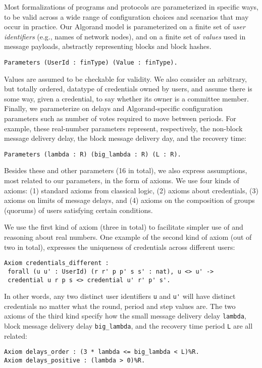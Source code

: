 Most formalizations of programs and protocols are parameterized in specific ways, to be valid across a wide range of configuration choices and scenarios that may occur in practice. Our Algorand model is parameterized on a finite set of \emph{user identifiers} (e.g., names of network nodes), and on a finite set of \emph{values} used in message payloads, abstractly representing blocks and block hashes.

\begin{lstlisting}[language=Coq]
Parameters (UserId : finType) (Value : finType).
\end{lstlisting}

Values are assumed to be checkable for validity. We also consider an arbitrary, but totally ordered, datatype of credentials owned by users, and assume there is some way, given a credential, to say whether its owner is a committee member. Finally, we parameterize on delays and Algorand-specific configuration parameters such as number of votes required to move between periods. For example, these real-number parameters represent, respectively, the non-block message delivery delay, the block message delivery day, and the recovery time:
\begin{lstlisting}[language=Coq]
Parameters (lambda : R) (big_lambda : R) (L : R).
\end{lstlisting}

Besides these and other parameters (16 in total), we also express assumptions, most related to our parameters, in the form of axioms. We use four kinds of axioms:
(1) standard axioms from classical logic, (2) axioms about credentials, (3) axioms on limits of message delays, and (4) axioms on the composition of groups (quorums) of users satisfying certain conditions.

We use the first kind of axiom (three in total) to facilitate simpler use of and reasoning about real numbers.
One example of the second kind of axiom (out of two in total), expresses the uniqueness of credentials
across different users:
\begin{lstlisting}[language=Coq]
Axiom credentials_different :
 forall (u u' : UserId) (r r' p p' s s' : nat), u <> u' ->
 credential u r p s <> credential u' r' p' s'.
\end{lstlisting}
In other words, any two distinct user identifiers \lstinline{u} and \lstinline{u'} will have distinct credentials no matter what the round, period and step values are.
The two axioms of the third kind specify how the small message delivery delay \lstinline{lambda}, block message delivery delay \lstinline{big_lambda}, and the recovery time period \lstinline{L} are all related:
\begin{lstlisting}[language=Coq]
Axiom delays_order : (3 * lambda <= big_lambda < L)%R.
Axiom delays_positive : (lambda > 0)%R.
\end{lstlisting}

